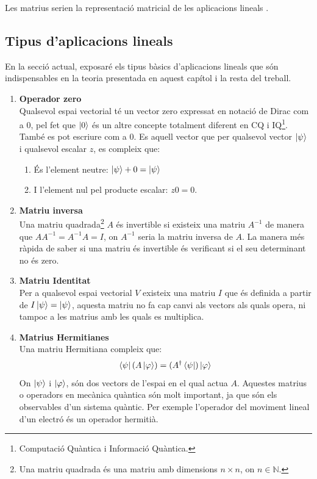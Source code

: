 Les matrius serien la representació matricial de les aplicacions lineals \cite{LR_done_right:matrix}.

\subsection{Tipus d'aplicacions lineals}
En la secció actual, exposaré els tipus bàsics d'aplicacions lineals que són indispensables en la teoria presentada en aquest capítol i la resta del treball.

\begin{enumerate}
	\item \textbf{Operador zero} \\
	Qualsevol espai vectorial té un vector zero expressat en notació de Dirac com a $0$, pel fet que $\ket{0}$ és un altre concepte totalment diferent en CQ i IQ\footnote{Computació Quàntica i Informació Quàntica.}. També es pot escriure com a $0$. Es aquell vector que per qualsevol vector $\ket{\psi}$ i qualsevol escalar $z$, es compleix que: 
	\begin{enumerate}
		\item És l'element neutre: $\ket{\psi} + 0 = \ket{\psi} $
		\item I l'element nul pel producte escalar: $z0 = 0$. 
	\end{enumerate}
	
	
	\item \textbf{Matriu inversa} \\
	Una matriu quadrada\footnote{Una matriu quadrada és una matriu amb dimensions $n\times n$, on $n \in \mathbb{N}$.} $A$ és invertible si existeix una matriu $A^{-1}$ de manera que $AA^{-1}=A^{-1}A = I$, on $A^{-1}$ seria la matriu inversa de $A$. La manera més ràpida de saber si una matriu és invertible és verificant si el seu determinant no és zero.

	\item \textbf{Matriu Identitat} \\
	Per a qualsevol espai vectorial $V$ existeix una matriu $I$ que és definida a partir de $I\ket{\psi} = \ket{\psi}$, aquesta matriu no fa cap canvi als vectors als quals opera, ni tampoc a les matrius amb les quals es multiplica.
	
	\item \textbf{Matrius Hermitianes} \\
	Una matriu Hermitiana compleix que: 
	$$
	\bra{\psi} (A \ket{\varphi}) = (A^\dagger\bra{\psi})\ket{\varphi}
	$$
	On $\ket{\psi}$ i $\ket{\varphi}$, són dos vectors de l'espai en el qual actua $A$. Aquestes matrius o operadors en mecànica quàntica són molt important, ja que són els observables d'un sistema quàntic. Per exemple l'operador del moviment lineal d'un electró és un operador hermitià. 
	

\end{enumerate}
